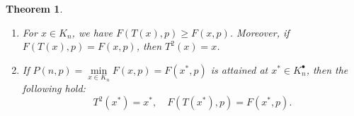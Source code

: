 \documentclass[a4paper,fleqn,numbers]{cas-sc}
\newtheorem{theorem}{Theorem}[section]
\begin{document}
%		
	
	\begin{theorem}
		\begin{enumerate}
			\item For $x \in K_n$, we have $F(T(x),p) \geq F(x,p)$. Moreover, if $F(T(x),p) = F(x,p)$, then $T^2(x) = x$.
			\item If $P(n,p)=\min\limits_{x \in {K}_n} F(x,p) = F(x^* ,p)$ is attained at $x^* \in K_n^{\bullet}$, then the following hold:
			\[
			T^2(x^*) = x^*,\quad F(T(x^*),p) = F(x^*,p).
			\]
		\end{enumerate}
	\end{theorem}
	
\end{document}

